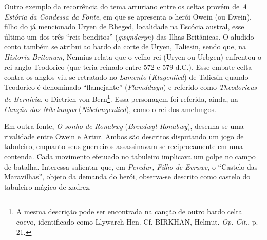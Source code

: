 Outro exemplo da recorrência do tema arturiano entre os celtas provém de
\textit{A Estória da Condessa da Fonte}, em que se apresenta o herói Owein (ou
Ewein), filho do já mencionado Uryen de Rheged, localidade na Escócia austral,
esse último um dos três “reis benditos” (\textit{gwynderyn}) das Ilhas
Britânicas. O aludido conto também se atribui ao bardo da corte de Uryen,
Taliesin, sendo que, na \textit{Historia Britonum}, Nennius relata que o velho
rei (Uryen ou Urbgen) enfrentou o rei anglo Teodorico (que teria reinado entre
572 e 579 d.C.). Esse embate celta contra os anglos viu-se retratado no
\textit{Lamento} (\textit{Klagenlied}) de Taliesin quando Teodorico é
denominado “flamejante” (\textit{Flamddwyn}) e referido como
\textit{Theodoricus de Bernicia}, o Dietrich von Bern\footnote{ A mesma
descrição pode ser encontrada na canção de outro bardo celta coevo,
identificado como Llywarch Hen. Cf. BIRKHAN, Helmut. \textit{Op. Cit}., p. 21.
}. Essa personagem foi referida, ainda, na \textit{Canção dos Nibelungos}
(\textit{Nibelungenlied}), como o rei dos amelungos. 

Em outra fonte, \textit{O sonho de Ronabwy} (\textit{Breudwyt Ronabwy}),
desenha-se uma rivalidade entre Owein e Artur. Ambos são descritos disputando
um jogo de tabuleiro, enquanto seus guerreiros assassinavam-se reciprocamente
em uma contenda. Cada movimento efetuado no tabuleiro implicava um golpe no
campo de batalha. Interessa salientar que, em \textit{Peredur, Filho de
Evrawc}, o “Castelo das Maravilhas”, objeto da demanda do herói, observa-se
descrito como castelo do tabuleiro mágico de xadrez. 

